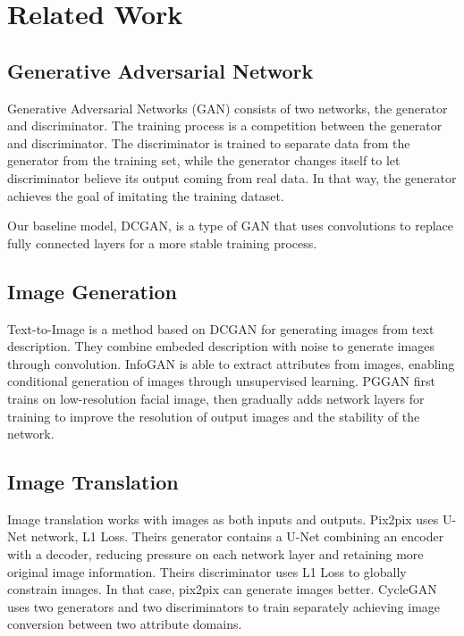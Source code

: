 \section{Related Work}


\subsection{Generative Adversarial Network}
Generative Adversarial Networks (GAN) consists of two networks, the generator and discriminator.
The training process is a competition between the generator and discriminator.
The discriminator is trained to separate data from the generator from the training set,
    while the generator changes itself to let discriminator believe its output coming from real data.
In that way, the generator achieves the goal of imitating the training dataset.

Our baseline model, DCGAN, is a type of GAN that uses convolutions to replace fully connected layers for a more stable training process.


\subsection{Image Generation}

Text-to-Image is a method based on DCGAN for generating images from text description.
They combine embeded description with noise to generate images through convolution.
InfoGAN is able to extract attributes from images, enabling conditional generation of images through unsupervised learning.
PGGAN first trains on low-resolution facial image, then gradually adds network layers for training to improve the resolution of output images and the stability of the network.

\subsection{Image Translation}
Image translation works with images as both inputs and outputs.
Pix2pix uses U-Net network, L1 Loss.
Theirs generator contains a U-Net combining an encoder with a decoder,
    reducing pressure on each network layer and retaining more original image information.
Theirs discriminator uses L1 Loss to globally constrain images.
In that case, pix2pix can generate images better.
CycleGAN uses two generators and two discriminators to train separately achieving image conversion between two attribute domains.

